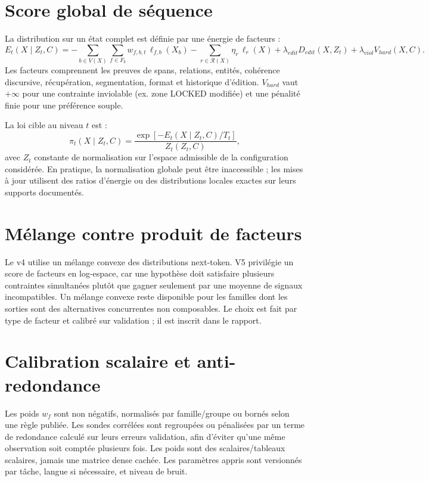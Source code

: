 \documentclass[11pt,a4paper,oneside]{report}
\begin{document}
\section{Score global de séquence}
La distribution sur un état complet est définie par une énergie de facteurs :
\[
E_t(X\mid Z_t,C)=
-\sum_{b\in V(X)}\sum_{f\in F_b}w_{f,b,t}\,\ell_{f,b}(X_b)
-\sum_{r\in\mathcal R(X)}\eta_r\,\ell_r(X)
+\lambda_{edit}D_{edit}(X,Z_t)
+\lambda_{viol}V_{hard}(X,C).
\]
Les facteurs comprennent les preuves de spans, relations, entités, cohérence discursive, récupération, segmentation, format et historique d'édition. $V_{hard}$ vaut $+\infty$ pour une contrainte inviolable (ex. zone LOCKED modifiée) et une pénalité finie pour une préférence souple.

La loi cible au niveau $t$ est :
\[
\pi_t(X\mid Z_t,C)=\frac{\exp[-E_t(X\mid Z_t,C)/T_t]}
{Z_t(Z_t,C)},
\]
avec $Z_t$ constante de normalisation sur l'espace admissible de la configuration considérée. En pratique, la normalisation globale peut être inaccessible ; les mises à jour utilisent des ratios d'énergie ou des distributions locales exactes sur leurs supports documentés.

\section{Mélange contre produit de facteurs}
Le v4 utilise un mélange convexe des distributions next-token. V5 privilégie un score de facteurs en log-espace, car une hypothèse doit satisfaire plusieurs contraintes simultanées plutôt que gagner seulement par une moyenne de signaux incompatibles. Un mélange convexe reste disponible pour les familles dont les sorties sont des alternatives concurrentes non composables. Le choix est fait par type de facteur et calibré sur validation ; il est inscrit dans le rapport.

\section{Calibration scalaire et anti-redondance}
Les poids $w_f$ sont non négatifs, normalisés par famille/groupe ou bornés selon une règle publiée. Les sondes corrélées sont regroupées ou pénalisées par un terme de redondance calculé sur leurs erreurs validation, afin d'éviter qu'une même observation soit comptée plusieurs fois. Les poids sont des scalaires/tableaux scalaires, jamais une matrice dense cachée. Les paramètres appris sont versionnés par tâche, langue si nécessaire, et niveau de bruit.
\end{document}
